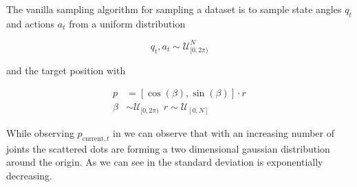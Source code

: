 The vanilla sampling algorithm for sampling a dataset is to sample state angles $q_t$ and actions $a_t$ from a uniform distribution

\begin{equation} \label{eqn:angle_sample}
    q_t, a_t \sim \mathcal{U}_{[0, 2\pi)}^N
\end{equation}

and the target position with

\begin{align}
    p &= [\cos(\beta), \sin(\beta)] \cdot r \label{eqn:position_sample}\\
    \beta &\sim \mathcal{U}_{[0, 2\pi)} \ \ r \sim \mathcal{U}_{[0, N]} \nonumber
\end{align}

While observing $p_{\text{current}, t}$ in  we can observe that with an increasing number of joints the scattered dots are forming a two dimensional gaussian distribution around the origin. As we can see in  the standard deviation is exponentially decreasing. 
